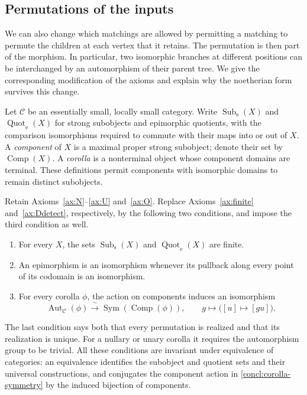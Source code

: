 \documentclass[11pt,a4paper]{article}
\theoremstyle{plain}
\theoremstyle{definition}
\theoremstyle{remark}
\newcommand{\C}{\mathcal C}
\newcommand{\Comp}{\operatorname{Comp}}
\begin{document}
\subsection{Permutations of the inputs}\label{concl:symmetry}
We can also change which matchings are allowed by permitting
a matching to permute the children at each vertex that it retains.
The permutation is then part of the morphism. In particular, two
isomorphic branches at different positions can be interchanged by an
automorphism of their parent tree. We give the corresponding modification
of the axioms and explain why the noetherian form survives this change.

Let $\C$ be an essentially small, locally small category. Write
$\operatorname{Sub}_{\mathrm{s}}(X)$ and
$\operatorname{Quot}_{\mathrm{e}}(X)$ for strong subobjects and
epimorphic quotients, with the comparison isomorphisms required to
commute with their maps into or out of $X$. A \emph{component} of $X$
is a maximal proper strong subobject; denote their set by $\Comp(X)$.
A \emph{corolla} is a nonterminal object whose component domains are
terminal. These definitions permit components with isomorphic domains
to remain distinct subobjects.

Retain Axioms~\ref{ax:N}--\ref{ax:U} and~\ref{ax:O}. Replace
Axioms~\ref{ax:finite} and~\ref{ax:Ddetect}, respectively, by the
following two conditions, and impose the third condition as well.
\begin{enumerate}
\item For every $X$, the sets $\operatorname{Sub}_{\mathrm{s}}(X)$
and $\operatorname{Quot}_{\mathrm{e}}(X)$ are finite.
\item An epimorphism is an isomorphism whenever its pullback along
every point of its codomain is an isomorphism.
\item For every corolla $\phi$, the action on components induces
an isomorphism
\begin{equation}\label{concl:corolla-symmetry}
 \operatorname{Aut}_{\C}(\phi)
 \xrightarrow{\ \sim\ }\operatorname{Sym}(\Comp(\phi)),
 \qquad g\longmapsto\bigl([u]\longmapsto[gu]\bigr).
\end{equation}
\end{enumerate}
The last condition says both that every permutation is realized and
that its realization is unique. For a nullary or unary corolla it
requires the automorphism group to be trivial. All these conditions
are invariant under equivalence of categories: an equivalence
identifies the subobject and quotient sets and their universal
constructions, and conjugates the component action in
\eqref{concl:corolla-symmetry} by the induced bijection of components.
\end{document}
